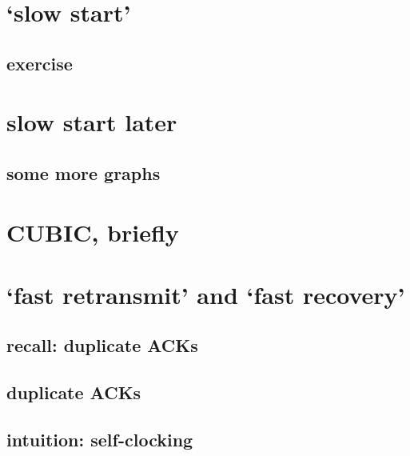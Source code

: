 \section{`slow start'}

\subsection{exercise}


\section{slow start later}


\subsection{some more graphs}


\section{CUBIC, briefly}



\section{`fast retransmit' and `fast recovery'}

\subsection{recall: duplicate ACKs}


\subsection{duplicate ACKs}

\subsection{intuition: self-clocking}


